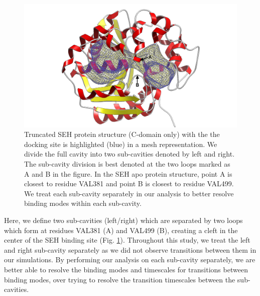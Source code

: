 \begin{figure}
    \centering
    \includegraphics[width=\linewidth]{chapter6/Figures/protein-mark.png}
    \caption[Truncated SEH Protein Structure]{Truncated SEH protein structure (C-domain only) with the the docking site is highlighted (blue) in a mesh representation. We divide the full cavity into two sub-cavities denoted by left and right. The sub-cavity division is best denoted at the two loops marked as A and B in the figure. In the SEH apo protein structure, point A is closest to residue VAL381 and point B is closest to residue VAL499. We treat each sub-cavity separately in our analysis to better resolve binding modes within each sub-cavity.}
    \label{fig:truncated-protein}
\end{figure}

Here, we define two sub-cavities (left/right) which are separated by two loops which form at residues VAL381 (A) and VAL499 (B), creating a cleft in the center of the SEH binding site (Fig. \ref{fig:truncated-protein}).
Throughout this study, we treat the left and right sub-cavity separately as we did not observe transitions between them in our simulations.
By performing our analysis on each sub-cavity separately, we are better able to resolve the binding modes and timescales for transitions between binding modes, over trying to resolve the transition timescales between the sub-cavities.


